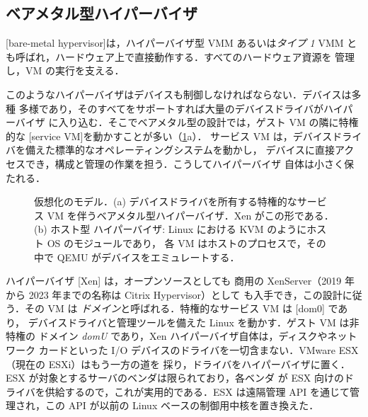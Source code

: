 \documentclass[../main.tex]{subfiles}
\begin{document}
\subsection{ベアメタル型ハイパーバイザ}

\begin{definition}[ベアメタル型ハイパーバイザ]
  [bare-metal hypervisor]は，ハイパーバイザ型 VMM あるいは\emph{タイプ 1}
  VMM とも呼ばれ，ハードウェア上で直接動作する．すべてのハードウェア資源を
  管理し，VM の実行を支える．
\end{definition}

このようなハイパーバイザはデバイスも制御しなければならない．デバイスは多種
多様であり，そのすべてをサポートすれば大量のデバイスドライバがハイパーバイザ
に入り込む．そこでベアメタル型の設計では，ゲスト VM の隣に特権的な
[service VM]を動かすことが多い（\cref{fig:l12-models}a）．
サービス VM は，デバイスドライバを備えた標準的なオペレーティングシステムを動かし，
デバイスに直接アクセスでき，構成と管理の作業を担う．こうしてハイパーバイザ
自体は小さく保たれる．

\begin{figure}[htbp]
  \centering
  
  \caption{仮想化のモデル．(a) デバイスドライバを所有する特権的なサービス VM
    を伴うベアメタル型ハイパーバイザ．Xen がこの形である．(b) ホスト型
    ハイパーバイザ: Linux における KVM のようにホスト OS のモジュールであり，
    各 VM はホストのプロセスで，その中で QEMU がデバイスをエミュレートする．}
  \label{fig:l12-models}
\end{figure}

ハイパーバイザ [Xen] \cite{barham2003} は，オープンソースとしても
商用の XenServer（2019 年から 2023 年までの名称は Citrix Hypervisor）として
も入手でき，この設計に従う．その VM は
\emph{ドメイン}と呼ばれる．特権的なサービス VM は [dom0] であり，
デバイスドライバと管理ツールを備えた Linux を動かす．ゲスト VM は非特権の
ドメイン \emph{domU} であり，Xen ハイパーバイザ自体は，ディスクやネットワーク
カードといった I/O デバイスのドライバを一切含まない．VMware ESX（現在の ESXi）はもう一方の道を
採り，ドライバをハイパーバイザに置く．ESX が対象とするサーバのベンダは限られており，各ベンダ
が ESX 向けのドライバを供給するので，これが実用的である．ESX は遠隔管理 API
を通じて管理され，この API が以前の Linux ベースの制御用中核を置き換えた．
\end{document}
